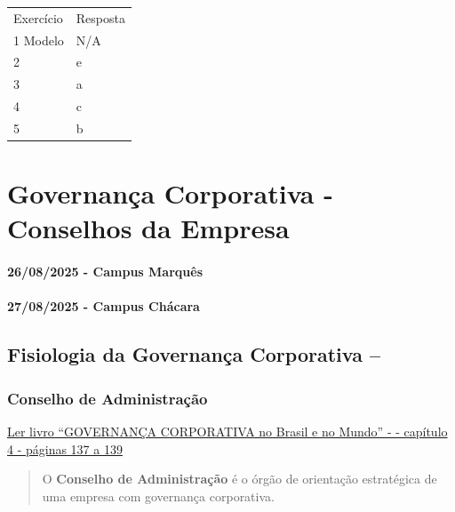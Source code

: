 \documentclass[
]{book}
\begin{document}
\begin{longtable}[]{@{}ll@{}}
\toprule\noalign{}
\endhead
\bottomrule\noalign{}
\endlastfoot
Exercício & Resposta \\
1 Modelo & N/A \\
2 & e \\
3 & a \\
4 & c \\
5 & b \\
\end{longtable}

\chapter{Governança Corporativa - Conselhos da Empresa}\label{governanuxe7a-corporativa---conselhos-da-empresa}

\subsubsection*{26/08/2025 - Campus Marquês}\label{campus-marquuxeas-3}

\subsubsection*{27/08/2025 - Campus Chácara}\label{campus-chuxe1cara-3}

\section{Fisiologia da Governança Corporativa --}\label{fisiologia-da-governanuxe7a-corporativa}

\subsection{Conselho de Administração}\label{conselho-de-administrauxe7uxe3o}

\href{https://pdfcoffee.com/governana-corporativa-no-brasil-e-no-mundo-pdf-free.html}{Ler livro ``GOVERNANÇA CORPORATIVA no Brasil e no Mundo'' - - capítulo 4 - páginas 137 a 139}

\begin{quote}
O \textbf{Conselho de Administração} é o órgão de orientação estratégica de uma empresa com governança corporativa.
\end{quote}
\end{document}
